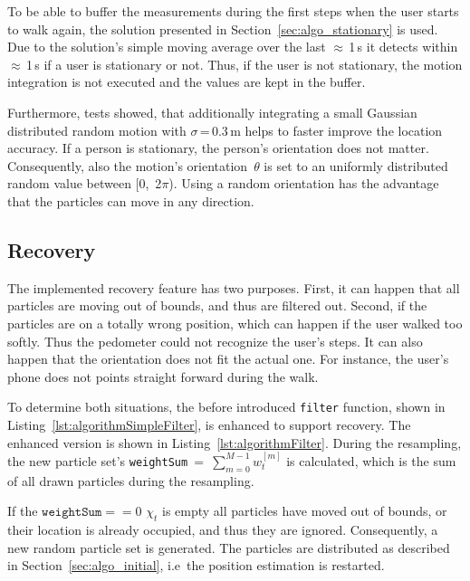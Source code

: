 To be able to buffer the measurements during the first steps when the user starts to walk again, the solution presented in Section~\ref{sec:algo_stationary} is used. Due to the solution's simple moving average over the last $\approx$\,1\,s it detects within $\approx$\,1\,s if a user is stationary or not. Thus, if the user is not stationary, the motion integration is not executed and the values are kept in the buffer.

Furthermore, tests showed, that additionally integrating a small Gaussian distributed random motion with $\sigma$\,=\,0.3\,m helps to faster improve the location accuracy. If a person is stationary, the person's orientation does not matter. Consequently, also the motion's orientation~$\theta$ is set to an uniformly distributed random value between [0,~2$\pi$). Using a random orientation has the advantage that the particles can move in any direction.




\subsection{Recovery}\label{sec:algo_recovery}
The implemented recovery feature has two purposes. First, it can happen that all particles are moving out of bounds, and thus are filtered out. Second, if the particles are on a totally wrong position, which can happen if the user walked too softly. Thus the pedometer could not recognize the user's steps. It can also happen that the orientation does not fit the actual one. For instance, the user's phone does not points straight forward during the walk.

To determine both situations, the before introduced \texttt{filter} function, shown in Listing~\ref{lst:algorithmSimpleFilter}, is enhanced to support recovery. The enhanced version is shown in Listing~\ref{lst:algorithmFilter}. During the resampling, the new particle set's \texttt{weightSum}~=~$\sum_{m = 0}^{M-1} w^{[m]}_t$ is calculated, which is the sum of all drawn particles during the resampling.

If the $\texttt{weightSum} == 0$ $\chi_t$ is empty all particles have moved out of bounds, or their location is already occupied, and thus they are ignored. Consequently, a new random particle set is generated. The particles are distributed as described in Section~\ref{sec:algo_initial}, i.e\ the position estimation is restarted.

